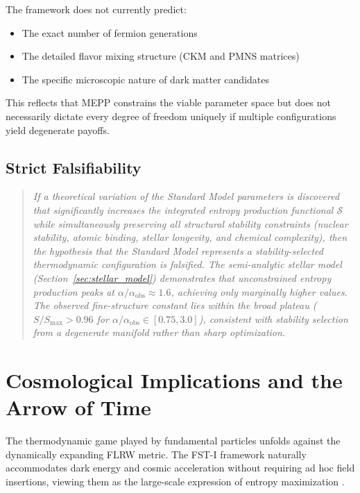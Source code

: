 \documentclass[12pt,a4paper]{article}
\theoremstyle{remark}
\begin{document}
The framework does not currently predict:
\begin{itemize}
    \item The exact number of fermion generations
    \item The detailed flavor mixing structure (CKM and PMNS matrices)
    \item The specific microscopic nature of dark matter candidates
\end{itemize}

This reflects that MEPP constrains the viable parameter space but does not necessarily dictate every degree of freedom uniquely if multiple configurations yield degenerate payoffs.

\subsection{Strict Falsifiability}

\begin{quote}
\textit{If a theoretical variation of the Standard Model parameters is discovered that significantly increases the integrated entropy production functional $\mathcal{S}$ while simultaneously preserving all structural stability constraints (nuclear stability, atomic binding, stellar longevity, and chemical complexity), then the hypothesis that the Standard Model represents a stability-selected thermodynamic configuration is falsified. The semi-analytic stellar model (Section~\ref{sec:stellar_model}) demonstrates that unconstrained entropy production peaks at $\alpha/\alpha_{\mathrm{obs}} \approx 1.6$, achieving only marginally higher values. The observed fine-structure constant lies within the broad plateau ($S/S_{\max} > 0.96$ for $\alpha/\alpha_{\mathrm{obs}} \in [0.75, 3.0]$), consistent with stability selection from a degenerate manifold rather than sharp optimization.}
\end{quote}

\section{Cosmological Implications and the Arrow of Time}
\label{sec:cosmology}

The thermodynamic game played by fundamental particles unfolds against the dynamically expanding FLRW metric. The FST-I framework naturally accommodates dark energy and cosmic acceleration without requiring ad hoc field insertions, viewing them as the large-scale expression of entropy maximization \citep{HiggsVEV2024}.
\end{document}
